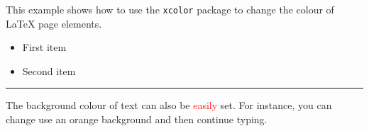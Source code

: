 \documentclass{article}
\begin{document}
This example shows how to use the \texttt{xcolor} package 
to change the colour of \LaTeX{} page elements.

\begin{itemize}
\color{ForestGreen}
\item First item
\item Second item
\end{itemize}

\noindent
{\color{RubineRed} \rule{\linewidth}{0.5mm}}

The background colour of text can also be \textcolor{red}{easily} set. For 
instance, you can change use an \colorbox{BurntOrange}{orange background} and then continue typing.
\end{document}
